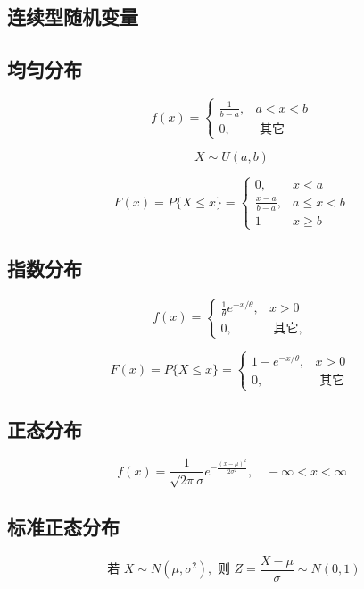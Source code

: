 \subsection{连续型随机变量}

\subsection{均匀分布}

$$
f(x)=\left\{\begin{array}{cc}
\frac{1}{b-a}, & a<x<b \\
0, & \text { 其它 }
\end{array}\right.
$$

$$ X \sim U(a,b) $$

$$
F(x)=P\{X \leq x\}=\left\{\begin{array}{ll}
0, & x<a \\
\frac{x-a}{b-a}, & a \leq x<b \\
1 & x \geq b
\end{array}\right.
$$

\subsection{指数分布}

$$
f(x)=\left\{\begin{array}{ll}
\frac{1}{\theta} e^{-x / \theta}, & x>0 \\
0, & \text { 其它, }
\end{array}\right.
$$

$$
F(x)=P\{X \leq x\}=\left\{\begin{array}{ll}
1-e^{-x / \theta}, & x>0 \\
0, & \text { 其它 }
\end{array}\right.
$$

\subsection{正态分布}

$$
f(x)=\frac{1}{\sqrt{2 \pi} \sigma} e^{-\frac{(x-\mu)^{2}}{2 \sigma^{2}}}, \quad-\infty<x<\infty
$$

\subsection{标准正态分布}

$$
\text { 若 } X \sim N\left(\mu, \sigma^{2}\right), \text { 则 } Z=\frac{X-\mu}{\sigma} \sim N({0}, 1)
$$

